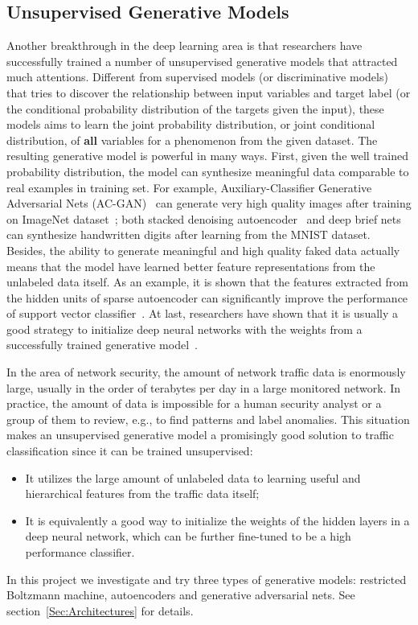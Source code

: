 \subsection{Unsupervised Generative Models}
Another breakthrough in the deep learning area is that researchers have successfully trained
a number of unsupervised generative models that attracted much attentions.
Different from supervised models (or discriminative models) that tries to discover
the relationship between input variables and target label (or the conditional probability distribution of the targets given the input),
these models aims to learn the joint probability distribution, or joint conditional distribution,
of \textbf{all} variables for a phenomenon from the given dataset.
The resulting generative model is powerful in many ways.
First, given the well trained probability distribution, the model can synthesize meaningful data
comparable to real examples in training set.
For example, Auxiliary-Classifier Generative Adversarial Nets (AC-GAN)~\cite{AC-GAN} can generate very high quality
images after training on ImageNet dataset~\cite{ImageNet};
both stacked denoising autoencoder~\cite{DenoiseAE} and deep brief nets~\cite{DeepBeliefNets} can synthesize
handwritten digits after learning from the MNIST dataset.
Besides, the ability to generate meaningful and high quality faked data actually means that
the model have learned better feature representations from the unlabeled data itself.
As an example, it is shown that the features extracted from the hidden units of sparse autoencoder
can significantly improve the performance of support vector classifier~\cite{SparseAE}.
At last, researchers have shown that it is usually a good strategy to initialize deep neural networks
with the weights from a successfully trained generative model~\cite{DeepBeliefNets, Momentum}.

In the area of network security, the amount of network traffic data is enormously large,
usually in the order of terabytes per day in a large monitored network.
In practice, the amount of data is impossible for a human security analyst or
a group of them to review, e.g., to find patterns and label anomalies.
This situation makes an unsupervised generative model a promisingly good solution
to traffic classification since it can be trained unsupervised:
\begin{itemize}
    \item It utilizes the large amount of unlabeled data to learning useful and hierarchical features
        from the traffic data itself;
    \item It is equivalently a good way to initialize the weights of the hidden layers
        in a deep neural network, which can be further fine-tuned to be a high performance classifier.
\end{itemize}
In this project we investigate and try three types of generative models:
restricted Boltzmann machine, autoencoders and generative adversarial nets.
See section~\ref{Sec:Architectures} for details.

